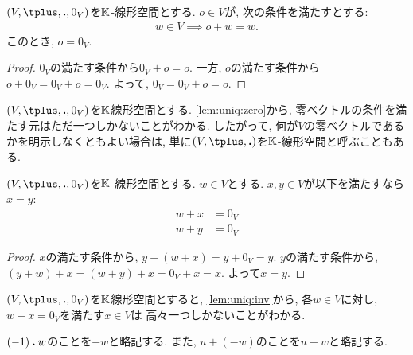\begin{prop}
  \label{lem:uniq:zero}
  $(V,\plus ,\act ,0_V)$を$\mathbb{K}$-線形空間とする.
  $o\in V$が, 次の条件を満たすとする:
  \begin{align*}
    w\in V \implies o\plus w=w.
  \end{align*}
  このとき, $o=0_V$.
\end{prop}
\begin{proof}
  $0_V$の満たす条件から$0_V\plus o=o$.
  一方, $o$の満たす条件から$o\plus 0_V=0_V\plus o=0_V$.
  よって, $0_V=0_V\plus o=o$.
\end{proof}
\begin{remark}
\label{rem:altdef:1}
  $(V,\plus,\act,0_V)$を$\mathbb{K}$線形空間とする.
  \cref{lem:uniq:zero}から,
  零ベクトルの条件を満たす元はただ一つしかないことがわかる.
  したがって, 
  何が$V$の零ベクトルであるかを明示しなくともよい場合は,
  単に$(V,\plus ,\act)$を$\mathbb{K}$-線形空間と呼ぶこともある.
\end{remark}

\begin{lemma}
  \label{lem:uniq:inv}
  $(V,\plus ,\act ,0_V)$を$\mathbb{K}$-線形空間とする.
  $w\in V$とする.
  $x,y\in V$が以下を満たすなら$x=y$:
  \begin{align*}
    w\plus x&=0_V\\
    w\plus y&=0_V
  \end{align*}
\end{lemma}
\begin{proof}
  $x$の満たす条件から,
  $y\plus (w\plus x)=y\plus 0_V=y$.
  $y$の満たす条件から,
  $(y\plus w)\plus x=(w\plus y)\plus x=0_V\plus x=x$.
  よって$x=y$.
\end{proof}
\begin{remark}
\label{rem:altdef:2}
$(V,\plus,\act,0_V)$を$\mathbb{K}$線形空間とすると,
\cref{lem:uniq:inv}から,
各$w\in V$に対し, $w\plus x=0_V$を満たす$x\in V$は
高々一つしかないことがわかる.
\end{remark}
\begin{remark}
  $(-1)\mathbin{\boldsymbol{.}} w$のことを$-w$と略記する.
  また, $u\plus (-w)$のことを$u-w$と略記する.
\end{remark}

